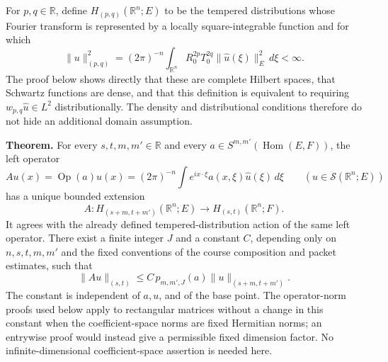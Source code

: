 \documentclass[
  11pt,
]{article}
\makeatletter
\let\ReaderOriginalAnchorStart\hyper@anchorstart
\let\ReaderOriginalAnchorEnd\hyper@anchorend
\let\ReaderPendingAliases\@empty
\def\ReaderArmAliases#1{\gdef\ReaderPendingAliases{#1}}
\def\hyper@anchorstart#1{\ReaderIfNativeAnchorTF{#1}{\ReaderPendingAliases\global\let\ReaderPendingAliases\@empty}{}\ReaderOriginalAnchorStart{#1}}
\makeatother
\begin{document}
For \(p,q\in\mathbb R\), define \(H_{(p,q)}(\mathbb R^n;E)\) to be the
tempered distributions whose Fourier transform is represented by a
locally square-integrable function and for which \[
 \|u\|_{(p,q)}^2=(2\pi)^{-n}
    \int_{\mathbb R^n}R_0^{2p}T_0^{2q}\|\widehat u(\xi)\|_E^2\,d\xi<\infty.
 \tag{MSB5}
\] The proof below shows directly that these are complete Hilbert
spaces, that Schwartz functions are dense, and that this definition is
equivalent to requiring \(w_{p,q}\widehat u\in L^2\) distributionally.
The density and distributional conditions therefore do not hide an
additional domain assumption.

\textbf{Theorem.} For every \(s,t,m,m'\in\mathbb R\) and every
\(a\in S^{m,m'}(\operatorname{Hom}(E,F))\), the left operator \[
 A u(x)=\operatorname{Op}(a)u(x)
 =(2\pi)^{-n}\int e^{ix\cdot\xi}a(x,\xi)\widehat u(\xi)\,d\xi
 \qquad(u\in\mathcal S(\mathbb R^n;E))
 \tag{MSB6}
\] has a unique bounded extension \[
 A:H_{(s+m,t+m')}(\mathbb R^n;E)
       \longrightarrow H_{(s,t)}(\mathbb R^n;F).
 \tag{MSB7}
\] It agrees with the already defined tempered-distribution action of
the same left operator. There exist a finite integer \(J\) and a
constant \(C\), depending only on \(n,s,t,m,m'\) and the fixed
conventions of the course composition and packet estimates, such that \[
 \|Au\|_{(s,t)}\leq C\,p_{m,m',J}(a)\|u\|_{(s+m,t+m')}.
 \tag{MSB8}
\] The constant is independent of \(a,u\), and of the base point. The
operator-norm proofs used below apply to rectangular matrices without a
change in this constant when the coefficient-space norms are fixed
Hermitian norms; an entrywise proof would instead give a permissible
fixed dimension factor. No infinite-dimensional coefficient-space
assertion is needed here.

\ReaderArmAliases{\ReaderOriginalAnchorStart{AN03-MSB-002}\ReaderOriginalAnchorEnd\begingroup\expandafter\def\csname @currentHref\endcsname{AN03-MSB-002}\label{AN03-MSB-002}\endgroup\ReaderOriginalAnchorStart{an03-msb-002-exact-bracket-correspondence-including-negative-orders}\ReaderOriginalAnchorEnd\begingroup\expandafter\def\csname @currentHref\endcsname{an03-msb-002-exact-bracket-correspondence-including-negative-orders}\label{an03-msb-002-exact-bracket-correspondence-including-negative-orders}\endgroup\ReaderOriginalAnchorStart{2-exact-bracket-correspondence-including-negative-orders}\ReaderOriginalAnchorEnd\begingroup\expandafter\def\csname @currentHref\endcsname{2-exact-bracket-correspondence-including-negative-orders}\label{2-exact-bracket-correspondence-including-negative-orders}\endgroup}
\end{document}
